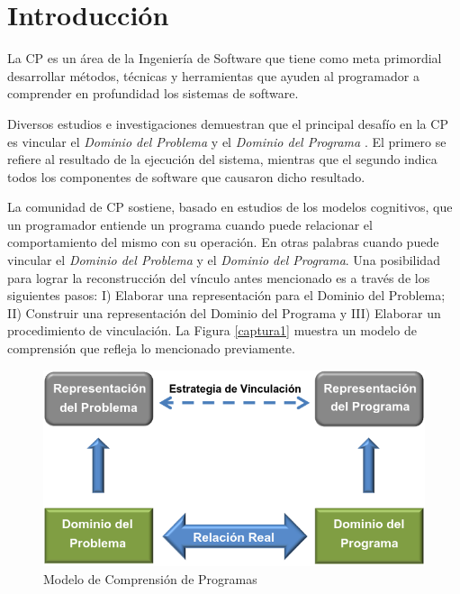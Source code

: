 
\section{Introducción}

La CP es un área de la Ingeniería de Software que tiene como meta primordial desarrollar métodos, técnicas y herramientas que ayuden al programador a comprender en profundidad los sistemas de software. 

Diversos estudios e investigaciones demuestran que el principal desafío en la CP es vincular el \textit{Dominio del Problema} y el \textit{Dominio del Programa} \cite{BRM10,MPMR07,MBPHRU10,DWE04}. El primero se refiere al resultado de la ejecución del sistema, mientras que el segundo indica todos los componentes de software que causaron dicho resultado. 

La comunidad de CP sostiene, basado en estudios de los modelos cognitivos, que un programador entiende un programa cuando puede relacionar el comportamiento del mismo con su operación. En otras palabras cuando puede vincular el \textit{Dominio del Problema} y el \textit{Dominio del Programa}. Una posibilidad para lograr la reconstrucción del vínculo antes mencionado es a través de los siguientes pasos: I) Elaborar una representación para el Dominio del Problema; II) Construir una representación del Dominio del Programa y III) Elaborar un procedimiento de vinculación. La Figura \ref{captura1} muestra un modelo de comprensión que refleja lo mencionado previamente.

\begin{figure}[t] %
\centerline{%
\includegraphics[scale= 0.7]{./cap2/dom.png}
}
\caption{Modelo de Comprensión de Programas}
\end{figure} \label{captura1}
 
